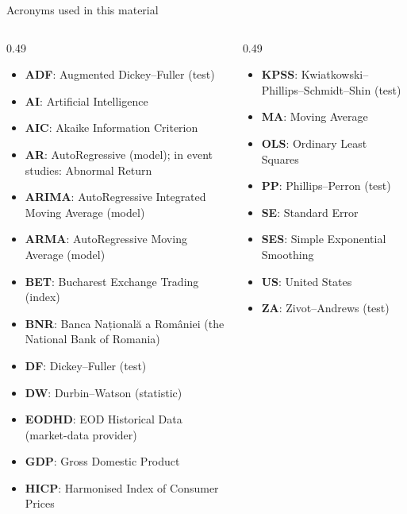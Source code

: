 {
\begin{frame}[noframenumbering]
    \titlepage
\end{frame}
}
\begin{frame}{Acronyms used in this material}
\begin{columns}[T]
\begin{column}{0.49\textwidth}
\begin{itemize}\setlength{\itemsep}{0pt}
    \item \textbf{ADF}: Augmented Dickey–Fuller (test)
    \item \textbf{AI}: Artificial Intelligence
    \item \textbf{AIC}: Akaike Information Criterion
    \item \textbf{AR}: AutoRegressive (model); in event studies: Abnormal Return
    \item \textbf{ARIMA}: AutoRegressive Integrated Moving Average (model)
    \item \textbf{ARMA}: AutoRegressive Moving Average (model)
    \item \textbf{BET}: Bucharest Exchange Trading (index)
    \item \textbf{BNR}: Banca Națională a României (the National Bank of Romania)
    \item \textbf{DF}: Dickey–Fuller (test)
    \item \textbf{DW}: Durbin–Watson (statistic)
    \item \textbf{EODHD}: EOD Historical Data (market-data provider)
    \item \textbf{GDP}: Gross Domestic Product
    \item \textbf{HICP}: Harmonised Index of Consumer Prices
\end{itemize}
\end{column}
\begin{column}{0.49\textwidth}
\begin{itemize}\setlength{\itemsep}{0pt}
    \item \textbf{KPSS}: Kwiatkowski–Phillips–Schmidt–Shin (test)
    \item \textbf{MA}: Moving Average
    \item \textbf{OLS}: Ordinary Least Squares
    \item \textbf{PP}: Phillips–Perron (test)
    \item \textbf{SE}: Standard Error
    \item \textbf{SES}: Simple Exponential Smoothing
    \item \textbf{US}: United States
    \item \textbf{ZA}: Zivot–Andrews (test)
\end{itemize}
\end{column}
\end{columns}
\end{frame}


